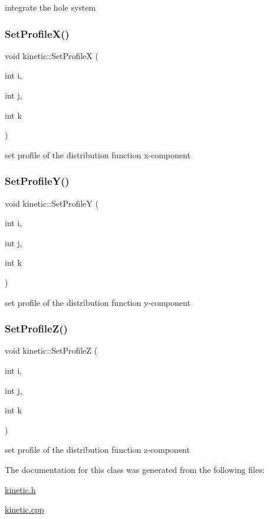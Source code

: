 integrate the hole system 

\mbox{\label{classkinetic_a7c0840510c51dc520d28db3080d6ed73}} 
\subsubsection{\texorpdfstring{Set\+Profile\+X()}{SetProfileX()}}
{\footnotesize\ttfamily void kinetic\+::\+Set\+ProfileX (\begin{DoxyParamCaption}\item[{int}]{i,  }\item[{int}]{j,  }\item[{int}]{k }\end{DoxyParamCaption})}



set profile of the distribution function x-\/component 

\mbox{\label{classkinetic_a93a573e6be25179788110632d4eac6e5}} 
\subsubsection{\texorpdfstring{Set\+Profile\+Y()}{SetProfileY()}}
{\footnotesize\ttfamily void kinetic\+::\+Set\+ProfileY (\begin{DoxyParamCaption}\item[{int}]{i,  }\item[{int}]{j,  }\item[{int}]{k }\end{DoxyParamCaption})}



set profile of the distribution function y-\/component 

\mbox{\label{classkinetic_af3dcca37fa51324f1f361665f3ada0d6}} 
\subsubsection{\texorpdfstring{Set\+Profile\+Z()}{SetProfileZ()}}
{\footnotesize\ttfamily void kinetic\+::\+Set\+ProfileZ (\begin{DoxyParamCaption}\item[{int}]{i,  }\item[{int}]{j,  }\item[{int}]{k }\end{DoxyParamCaption})}



set profile of the distribution function z-\/component 



The documentation for this class was generated from the following files\+:\begin{DoxyCompactItemize}
\item 
\mbox{\hyperlink{kinetic_8h}{kinetic.\+h}}\item 
\mbox{\hyperlink{kinetic_8cpp}{kinetic.\+cpp}}\end{DoxyCompactItemize}
